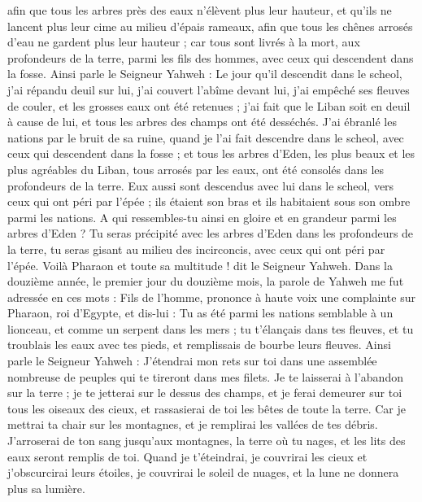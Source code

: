 \begin{multicols}{2}
afin que tous les arbres près des eaux n’élèvent plus leur hauteur, et qu’ils ne lancent plus leur cime au milieu d'épais rameaux, afin que tous les chênes arrosés d’eau ne gardent plus leur hauteur ; car tous sont livrés à la mort, aux profondeurs de la terre, parmi les fils des hommes, avec ceux qui descendent dans la fosse.
Ainsi parle le Seigneur Yahweh : Le jour qu'il descendit dans le scheol, j’ai répandu deuil sur lui, j’ai couvert l'abîme devant lui, j'ai empêché ses fleuves de couler, et les grosses eaux ont été retenues ; j’ai fait que le Liban soit en deuil à cause de lui, et tous les arbres des champs ont été desséchés.
J'ai ébranlé les nations par le bruit de sa ruine, quand je l’ai fait descendre dans le scheol, avec ceux qui descendent dans la fosse ; et tous les arbres d'Eden, les plus beaux et les plus agréables du Liban, tous arrosés par les eaux, ont été consolés dans les profondeurs de la terre.
Eux aussi sont descendus avec lui dans le scheol, vers ceux qui ont péri par l'épée ; ils étaient son bras et ils habitaient sous son ombre parmi les nations.
A qui ressembles-tu ainsi en gloire et en grandeur parmi les arbres d'Eden ? Tu seras précipité avec les arbres d'Eden dans les profondeurs de la terre, tu seras gisant au milieu des incirconcis, avec ceux qui ont péri par l'épée. Voilà Pharaon et toute sa multitude ! dit le Seigneur Yahweh.
\VerseOne{}Dans la douzième année, le premier jour du douzième mois, la parole de Yahweh me fut adressée en ces mots :
Fils de l’homme, prononce à haute voix une complainte sur Pharaon, roi d'Egypte, et dis-lui : Tu as été parmi les nations semblable à un lionceau, et comme un serpent dans les mers ; tu t'élançais dans tes fleuves, et tu troublais les eaux avec tes pieds, et remplissais de bourbe leurs fleuves.
Ainsi parle le Seigneur Yahweh : J'étendrai mon rets sur toi dans une assemblée nombreuse de peuples qui te tireront dans mes filets.
Je te laisserai à l'abandon sur la terre ; je te jetterai sur le dessus des champs, et je ferai demeurer sur toi tous les oiseaux des cieux, et rassasierai de toi les bêtes de toute la terre.
Car je mettrai ta chair sur les montagnes, et je remplirai les vallées de tes débris.
J'arroserai de ton sang jusqu’aux montagnes, la terre où tu nages, et les lits des eaux seront remplis de toi.
Quand je t’éteindrai, je couvrirai les cieux et j’obscurcirai leurs étoiles, je couvrirai le soleil de nuages, et la lune ne donnera plus sa lumière.

\end{multicols}
